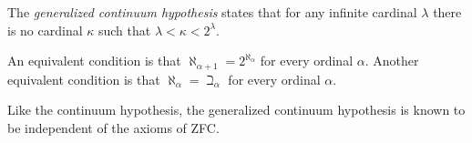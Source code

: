 \documentclass{article}
\begin{document}

The \emph{generalized continuum hypothesis} states that for any infinite cardinal $\lambda$ there is no cardinal $\kappa$ such that $\lambda <\kappa <2^{\lambda}$.

An equivalent condition is that $\aleph_{\alpha+1}=2^{\aleph_\alpha}$ for every ordinal $\alpha$.
Another equivalent condition is that $\aleph_\alpha=\beth_\alpha$ for every ordinal $\alpha$.

Like the continuum hypothesis, the generalized continuum hypothesis is known to be independent of the axioms of ZFC.
\end{document}
